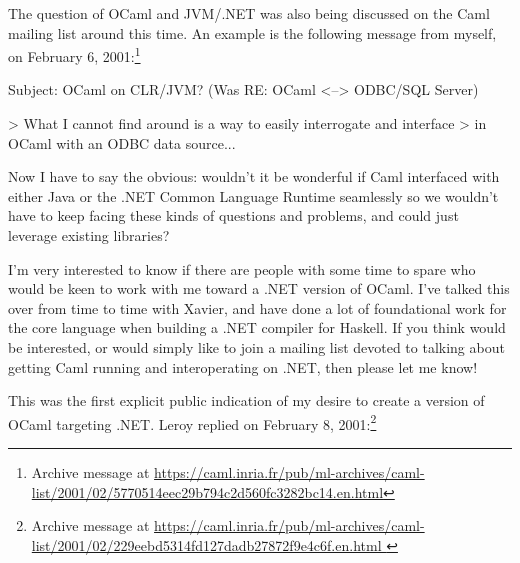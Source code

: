 \documentclass[acmsmall,review]{acmart}\settopmatter{printfolios=true,printccs=false,printacmref=false}
\begin{document}
The question of OCaml and JVM/.NET was also being discussed on the Caml mailing list around this time.  An example is the following message from myself, on February 6, 2001:\footnote{ Archive message at \url{https://caml.inria.fr/pub/ml-archives/caml-list/2001/02/5770514eec29b794c2d560fc3282bc14.en.html}}
\begin{verbquote}
Subject: OCaml on CLR/JVM? (Was RE: OCaml <--> ODBC/SQL Server)

> What I cannot find around is a way to easily interrogate and interface 
> in OCaml with an ODBC data source...

Now I have to say the obvious: wouldn't it be wonderful if Caml interfaced with either Java or the .NET Common Language Runtime seamlessly so we wouldn't have to keep facing these kinds of questions and problems, and could just leverage existing libraries?   

I'm very interested to know if there are people with some time to spare who would be keen to work with me toward a .NET version of OCaml.  I've talked this over from time to time with Xavier, and have done a lot of foundational work for the core language when building a .NET compiler for Haskell.  If you think would be interested, or would simply like to join a mailing list devoted to talking about getting Caml running and interoperating on .NET, then please let me know!
\end{verbquote}
This was the first explicit public indication of my desire to create a version of OCaml targeting .NET. Leroy replied on February 8, 2001:\footnote{ Archive message at \url{https://caml.inria.fr/pub/ml-archives/caml-list/2001/02/229eebd5314fd127dadb27872f9e4c6f.en.html }}
\end{document}
